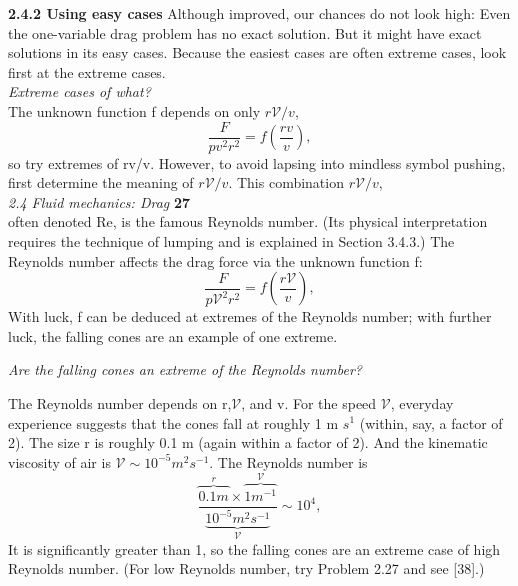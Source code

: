 \documentclass[a4paper, 12pt]{book}
\begin{document}
\textbf {2.4.2 Using easy cases}
Although improved, our chances do not look high: Even the one-variable
drag problem has no exact solution. But it might have exact solutions in
its easy cases. Because the easiest cases are often extreme cases, look first
at the extreme cases.\\

\textit{Extreme cases of what?}\\

The unknown function f depends on only $r\mathcal{V}/v$,
\begin{equation}\frac{F}{pv^2r^2}=f\left(\frac{rv}{v}\right),\end{equation}
so try extremes of rv/v. However, to avoid lapsing into mindless symbol
pushing, first determine the meaning of $r\mathcal{V}/v$. This combination $r\mathcal{V}/v$,
\\
\large\textit{2.4 Fluid mechanics: Drag} \hfill \textbf{27} \\

often denoted Re, is the famous Reynolds number. (Its physical interpretation
requires the technique of lumping and is explained in Section 3.4.3.)
The Reynolds number affects the drag force via the unknown function f:
\begin{equation}\frac{F}{p\mathcal{V}^2r^2}=f\left(\frac{r\mathcal{V}}{v}\right),\end{equation}
With luck, f can be deduced at extremes of the Reynolds number; with
further luck, the falling cones are an example of one extreme.

\textit{Are the falling cones an extreme of the Reynolds number?}

The Reynolds number depends on r,$\mathcal{V}$, and v. For the speed $\mathcal{V}$, everyday
experience suggests that the cones fall at roughly 1 m $s^1$ (within, say, a
factor of 2). The size r is roughly 0.1 m (again within a factor of 2). And
the kinematic viscosity of air is $\mathcal{V}\sim 10^{−5}m^{2}s^{−1}$. The Reynolds number is
\begin{equation}\frac{\overbrace{0.1m}^r\times \overbrace{1m^{-1}}^\mathcal{V}}{\underbrace{10^{−5}m^{2}s^{−1}}_\mathcal{V}}\sim 10^4,\end{equation}
It is significantly greater than 1, so the falling cones are an extreme case of high Reynolds number. (For low Reynolds number, try Problem 2.27 and see [38].)
\end{document}
